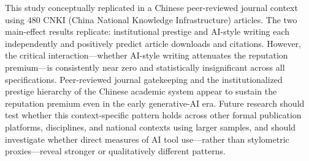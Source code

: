 \documentclass[12pt,a4paper]{article}
\begin{document}
This study conceptually replicated \citet{JoLi2026} in a Chinese
peer-reviewed journal context using 480 CNKI
(China National Knowledge Infrastructure) articles.
The two main-effect results replicate: institutional prestige and
AI-style writing each independently and positively predict article
downloads and citations.
However, the critical interaction---whether AI-style writing attenuates
the reputation premium---is consistently near zero and statistically
insignificant across all specifications.
Peer-reviewed journal gatekeeping and the institutionalized prestige
hierarchy of the Chinese academic system appear to sustain the
reputation premium even in the early generative-AI era.
Future research should test whether this context-specific pattern holds
across other formal publication platforms, disciplines, and national
contexts using larger samples, and should investigate whether direct
measures of AI tool use---rather than stylometric proxies---reveal
stronger or qualitatively different patterns.
\end{document}
